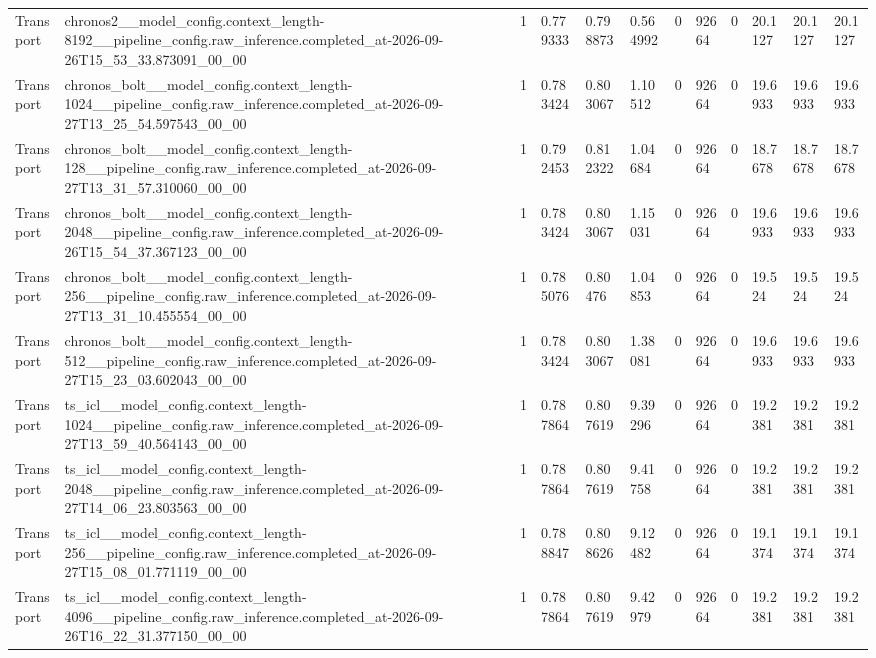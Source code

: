 \begin{tabular}{llllllllllll}
Transport & chronos2\_\_model\_config.context\_length-8192\_\_pipeline\_config.raw\_inference.completed\_at-2026-09-26T15\_53\_33.873091\_00\_00 & 1 & 0.779333 & 0.798873 & 0.564992 & 0 & 92664 & 0 & 20.1127 & 20.1127 & 20.1127 \\
Transport & chronos\_bolt\_\_model\_config.context\_length-1024\_\_pipeline\_config.raw\_inference.completed\_at-2026-09-27T13\_25\_54.597543\_00\_00 & 1 & 0.783424 & 0.803067 & 1.10512 & 0 & 92664 & 0 & 19.6933 & 19.6933 & 19.6933 \\
Transport & chronos\_bolt\_\_model\_config.context\_length-128\_\_pipeline\_config.raw\_inference.completed\_at-2026-09-27T13\_31\_57.310060\_00\_00 & 1 & 0.792453 & 0.812322 & 1.04684 & 0 & 92664 & 0 & 18.7678 & 18.7678 & 18.7678 \\
Transport & chronos\_bolt\_\_model\_config.context\_length-2048\_\_pipeline\_config.raw\_inference.completed\_at-2026-09-26T15\_54\_37.367123\_00\_00 & 1 & 0.783424 & 0.803067 & 1.15031 & 0 & 92664 & 0 & 19.6933 & 19.6933 & 19.6933 \\
Transport & chronos\_bolt\_\_model\_config.context\_length-256\_\_pipeline\_config.raw\_inference.completed\_at-2026-09-27T13\_31\_10.455554\_00\_00 & 1 & 0.785076 & 0.80476 & 1.04853 & 0 & 92664 & 0 & 19.524 & 19.524 & 19.524 \\
Transport & chronos\_bolt\_\_model\_config.context\_length-512\_\_pipeline\_config.raw\_inference.completed\_at-2026-09-27T15\_23\_03.602043\_00\_00 & 1 & 0.783424 & 0.803067 & 1.38081 & 0 & 92664 & 0 & 19.6933 & 19.6933 & 19.6933 \\
Transport & ts\_icl\_\_model\_config.context\_length-1024\_\_pipeline\_config.raw\_inference.completed\_at-2026-09-27T13\_59\_40.564143\_00\_00 & 1 & 0.787864 & 0.807619 & 9.39296 & 0 & 92664 & 0 & 19.2381 & 19.2381 & 19.2381 \\
Transport & ts\_icl\_\_model\_config.context\_length-2048\_\_pipeline\_config.raw\_inference.completed\_at-2026-09-27T14\_06\_23.803563\_00\_00 & 1 & 0.787864 & 0.807619 & 9.41758 & 0 & 92664 & 0 & 19.2381 & 19.2381 & 19.2381 \\
Transport & ts\_icl\_\_model\_config.context\_length-256\_\_pipeline\_config.raw\_inference.completed\_at-2026-09-27T15\_08\_01.771119\_00\_00 & 1 & 0.788847 & 0.808626 & 9.12482 & 0 & 92664 & 0 & 19.1374 & 19.1374 & 19.1374 \\
Transport & ts\_icl\_\_model\_config.context\_length-4096\_\_pipeline\_config.raw\_inference.completed\_at-2026-09-26T16\_22\_31.377150\_00\_00 & 1 & 0.787864 & 0.807619 & 9.42979 & 0 & 92664 & 0 & 19.2381 & 19.2381 & 19.2381 \\

\end{tabular}
